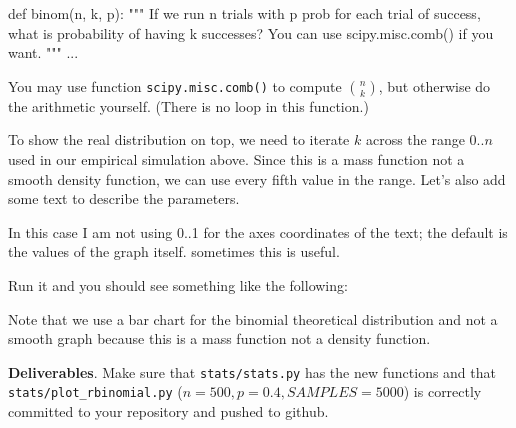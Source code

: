 \begin{fullwidth}
\begin{pyverbatim}
def binom(n, k, p):
    """
    If we run n trials with p prob for each trial of success,
    what is probability of having k successes? You can use scipy.misc.comb() if you want.
    """
    ...
\end{pyverbatim}

\noindent You may use function {\tt scipy.misc.comb()} to compute $n \choose k$, but otherwise do the arithmetic yourself. (There is no loop in this function.)

\step To show the real distribution on top, we need to iterate $k$ across the range $0..n$ used in our empirical  simulation above.  Since this is a mass function not a smooth density function, we can use every fifth value in the range. Let's also add some text to describe the parameters.


In this case I am not using 0..1 for the axes coordinates of the text; the default is the values of the graph itself. sometimes this is useful.

\step Run it and you should see something like the following:


Note that we use a bar chart for the binomial theoretical distribution and not a smooth graph because this is a mass function not a density function.

\begin{callout}{\bcplume}
{\bf Deliverables}. Make sure that {\tt stats/stats.py} has the new functions and that {\tt stats/plot\_rbinomial.py} ($n=500, p=0.4, SAMPLES=5000$) is correctly committed to your repository and pushed to github. 
\end{callout}

\end{fullwidth}
